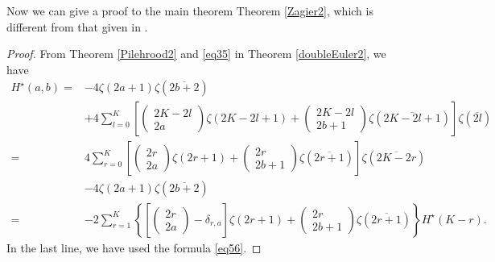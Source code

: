 \documentclass[reqno]{amsart}
\theoremstyle{definition}
\theoremstyle{remark}
\numberwithin{equation}{section}
\begin{document}
Now we can give a proof to the main theorem Theorem \ref{Zagier2}, which is different from that given in \cite{1, 11, 3}.
\begin{proof}
From Theorem \ref{Pilehrood2} and \eqref{eq35} in Theorem \ref{doubleEuler2}, we have
\begin{align*}
H^{\star}(a, b)
=&
-4 \zeta(2a+1)\zeta(\overline{2b+2})
\\&+4\sum_{l=0}^{K} \left[ \begin{pmatrix}2K-2l\\2a\end{pmatrix}\zeta(2K-2l+1) + \begin{pmatrix}2K-2l\\2b+1\end{pmatrix}\zeta(\overline{2K-2l+1})\right]\zeta(\overline{2l})
\\
=&4\sum_{r=0}^K\left[\begin{pmatrix}2r\\2a\end{pmatrix}\zeta(2r+1)
+\begin{pmatrix}2r\\2b+1\end{pmatrix}\zeta(\overline{2r+1})\right]\zeta(\overline{2K-2r})\\&-4 \zeta(2a+1)\zeta(\overline{2b+2})\\
=&-2\sum_{r=1}^{K} \left\{\left[\begin{pmatrix} 2r\\2a\end{pmatrix}-\delta_{r,a}\right]\zeta(2r+1)+\begin{pmatrix} 2r\\2b+1\end{pmatrix}\zeta(\overline{2r+1})\right\}H^{\star}(K-r).
\end{align*}In the last line, we have used the formula \eqref{eq56}.


\end{proof}
\end{document}
